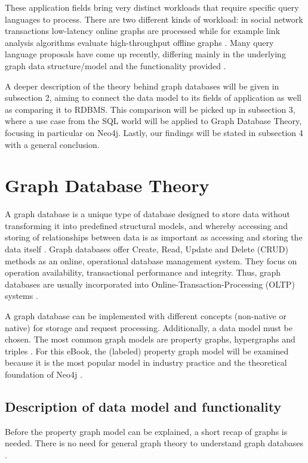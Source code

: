 These application fields bring very distinct workloads that require specific query languages to process. There are two different kinds of workload: in social network transactions low-latency online graphs are processed while for example link analysis algorithms evaluate high-throughput offline graphs \autocite{Angles2018AnIT}. Many query language proposals have come up recently, differing mainly in the underlying graph data structure/model and the functionality provided \autocite{Wood2012QueryLF}.

A deeper description of the theory behind graph databases will be given in subsection 2, aiming to connect the data model to its fields of application as well as comparing it to RDBMS. This comparison will be picked up in subsection 3, where a use case from the SQL world will be applied to Graph Database Theory, focusing in particular on Neo4j. Lastly, our findings will be stated in subsection 4 with a general conclusion.



\section{Graph Database Theory}
A graph database is a unique type of database designed to store data without transforming it into predefined structural models, and whereby accessing and storing of relationships between data is as important as accessing and storing the data itself \autocite{neo4j:graphdb}. Graph databases offer Create, Read, Update and Delete (CRUD) methods as an online, operational database management system. They focus on operation availability, transactional performance and integrity. Thus, graph databases are usually incorporated into Online-Transaction-Processing (OLTP) systems \autocite{graphdb2015}.

A graph database can be implemented with different concepts (non-native or native) for storage and request processing. Additionally, a data model must be chosen. The most common graph models are property graphs, hypergraphs and triples \autocite{graphdb2015}. For this eBook, the (labeled) property graph model will be examined because it is the most popular model in industry practice \autocite{graphdb2015} and the theoretical foundation of Neo4j \autocite{maheshlal2015}.


\subsection{Description of data model and functionality}
Before the property graph model can be explained, a short recap of graphs is needed. There is no need for general graph theory to understand graph databases \autocite{graphdb2015}.

